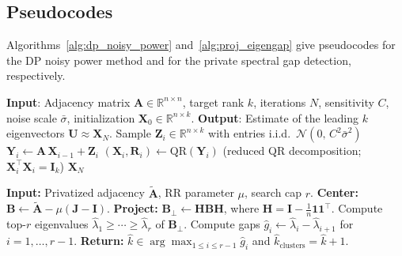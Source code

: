 \documentclass[11pt]{article}
\theoremstyle{plain}
\theoremstyle{definition}
\theoremstyle{remark}
\begin{document}
\subsection{Pseudocodes} 

Algorithms~\ref{alg:dp_noisy_power} and~\ref{alg:proj_eigengap} give pseudocodes for the DP noisy power method and for the private spectral gap detection, respectively.

\begin{algorithm}[h!]
\caption{DP Noisy Power Method}
\label{alg:dp_noisy_power}
\begin{algorithmic}[1]
\STATE \textbf{Input}: Adjacency matrix $\mathbf{A}\in\mathbb{R}^{n\times n}$, target rank $k$, iterations $N$, sensitivity $C$, noise scale $\bar{\sigma}$, initialization $\mathbf{X}_0\in\mathbb{R}^{n\times k}$.
\STATE \textbf{Output}: Estimate of the leading $k$ eigenvectors $\mathbf{U}\approx \mathbf{X}_N$.
    \STATE Sample $\mathbf{Z}_i \in \mathbb{R}^{n\times k}$ with entries i.i.d.\ $\mathcal{N}(0,\,C^2 \bar{\sigma}^2)$
    \STATE $\mathbf{Y}_i \leftarrow \mathbf{A}\,\mathbf{X}_{i-1} + \mathbf{Z}_i$
    \STATE $(\mathbf{X}_i,\mathbf{R}_i) \leftarrow \mathrm{QR}(\mathbf{Y}_i)$ \quad (reduced QR decomposition; $\mathbf{X}_i^\top\mathbf{X}_i = \mathbf{I}_k$)
\ENDFOR
\RETURN $\mathbf{X}_N$
\end{algorithmic}
\end{algorithm}



\begin{algorithm}[t]
\caption{Private Spectral Gap Detection}
\label{alg:proj_eigengap}
\begin{algorithmic}[1]
\STATE \textbf{Input:} Privatized adjacency $\widetilde{\mathbf A}$, RR parameter $\mu$, search cap $r$.
\STATE \textbf{Center:} $\mathbf B \leftarrow \widetilde{\mathbf A} - \mu(\mathbf J-\mathbf I)$.
\STATE \textbf{Project:} $\mathbf B_\perp \leftarrow \mathbf H \mathbf B \mathbf H$, where $\mathbf H=\mathbf I-\frac{1}{n}\mathbf 1\mathbf 1^\top$.
\STATE Compute top-$r$ eigenvalues $\hat\lambda_1\ge\cdots\ge\hat\lambda_r$ of $\mathbf B_\perp$.
\STATE Compute gaps $\hat g_i \leftarrow \hat\lambda_i-\hat\lambda_{i+1}$ for $i=1,\dots,r-1$.
\STATE \textbf{Return:} $\hat k \in \arg\max_{1\le i\le r-1} \hat g_i$ and $\widehat{k}_{\mathrm{clusters}}=\hat k+1$.
\end{algorithmic}
\end{algorithm}



\newpage
\end{document}

